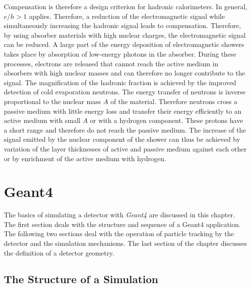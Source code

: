 \documentclass[12pt, a4paper]{thesis}
\begin{document}
Compensation is therefore a design criterion for hadronic
calorimeters. In general, \(e / h > 1\) applies. Therefore, a
reduction of the electromagnetic signal while simultaneously
increasing the hadronic signal leads to compensation. Therefore, by
using absorber materials with high nuclear charges, the
electromagnetic signal can be reduced. A large part of the energy
deposition of electromagnetic showers takes place by absorption of
low-energy photons in the absorber. During these processes, electrons
are released that cannot reach the active medium in absorbers with
high nuclear masses and can therefore no longer contribute to the
signal. The magnification of the hadronic fraction is achieved by the
improved detection of cold evaporation neutrons. The energy transfer
of neutrons is inverse proportional to the nuclear mass $A$ of the
material. Therefore neutrons cross a passive medium with little energy
loss and transfer their energy efficiently to an active medium with
small $A$ or with a hydrogen component. These protons have a short
range and therefore do not reach the passive medium. The increase of
the signal emitted by the nuclear component of the shower can thus be
achieved by variation of the layer thicknesses of active and passive
medium against each other or by enrichment of the active medium with
hydrogen.

\chapter{Geant4}
\label{sec:orgc423253}

The basics of simulating a detector with \emph{Geant4}
\cite{geant_simul_toolkit} are discussed in this chapter. The first
section deals with the structure and sequence of a Geant4
application. The following two sections deal with the operation of
particle tracking by the detector and the simulation mechanisms. The
last section of the chapter discusses the definition of a detector
geometry.

\section{The Structure of a Simulation}
\label{sec:org08164e5}
\end{document}

